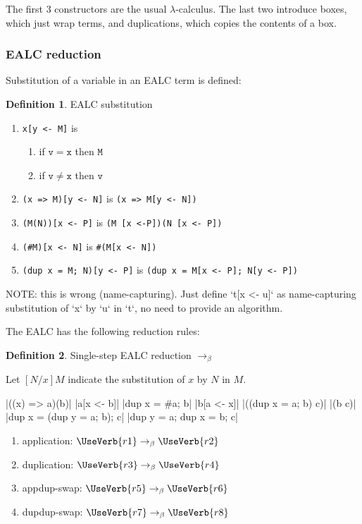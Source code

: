 \documentclass{article}
\theoremstyle{definition}
\newtheorem{definition}{Definition}
\theoremstyle{theorem}
\newcommand\rab{\rightarrow_{\beta}}
\newcommand\code{\mathtt}
\newcommand\SV{\SaveVerb}
\newcommand\UV{\UseVerb}
\begin{document}
The first 3 constructors are the usual $\lambda$-calculus. The last two
introduce boxes, which just wrap terms, and duplications, which copies the
contents of a box.

\subsubsection{EALC reduction}

Substitution of a variable in an EALC term is defined:
\begin{definition} EALC substitution
  \begin{enumerate}
    \item \verb|x[y <- M]| is
      \begin{enumerate}
        \item if $\code{v} = \code{x}$ then $\code{M}$
        \item if $\code{v} \neq \code{x}$ then $\code{v}$
      \end{enumerate}
    \item \verb|(x => M)[y <- N]| is \verb|(x => M[y <- N])|
    \item \verb|(M(N))[x <- P]| is \verb|(M [x <-P])(N [x <- P])|
    \item \verb|(#M)[x <- N]| is \verb|#(M[x <- N])|
    \item \verb|(dup x = M; N)[y <- P]| is
          \verb|(dup x = M[x <- P]; N[y <- P])|
  \end{enumerate}
\end{definition}

NOTE: this is wrong (name-capturing). Just define `t[x <- u]` as name-capturing
substitution of `x` by `u` in `t`, no need to provide an algorithm.

The EALC has the following reduction rules:

\begin{definition} Single-step EALC reduction $\rab$

Let $[N/x]M$ indicate the substitution of $x$ by $N$ in $M$.

\SV{r1}|((x) => a)(b)|
\SV{r2}|a[x <- b]|
\SV{r3}|dup x = #a; b|
\SV{r4}|b[a <- x]|
\SV{r5}|((dup x = a; b) c)|
\SV{r6}|(b c)|
\SV{r7}|dup x = (dup y = a; b); c|
\SV{r8}|dup y = a; dup x = b; c|
\begin{enumerate}
\item application: $\UV{r1} \rab \UV{r2}$
\item duplication: $\UV{r3} \rab \UV{r4}$
\item appdup-swap: $\UV{r5} \rab \UV{r6}$
\item dupdup-swap: $\UV{r7} \rab \UV{r8}$
\end{enumerate}
\end{definition}
\end{document}
